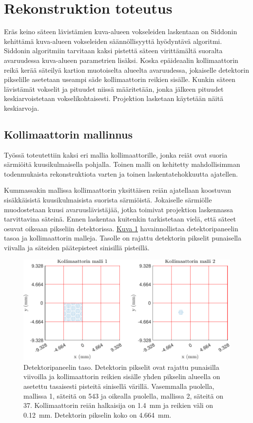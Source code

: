 \section{Rekonstruktion toteutus}
Eräs keino säteen lävistämien kuva-alueen vokseleiden laskentaan on Siddonin kehittämä kuva-alueen vokseleiden säännöllisyyttä hyödyntävä algoritmi\cite{siddon_fast_1985, sundermann_fast_1998}. Siddonin algoritmiin tarvitaan kaksi pistettä säteen virittämältä suoralta avaruudessa kuva-alueen parametrien lisäksi\cite{sundermann_fast_1998}. Koska epäideaalin kollimaattorin reikä kerää säteilyä kartion muotoiselta alueelta avaruudessa\cite{cherry_single_2012}, jokaiselle detektorin pikselille asetetaan useampi säde kollimaattorin reikien sisälle. Kunkin säteen lävistämät vokselit ja pituudet niissä määritetään, jonka jälkeen pituudet keskiarvoistetaan vokselikohtaisesti. Projektion lasketaan käytetään näitä keskiarvoja.

\subsection{Kollimaattorin mallinnus}
Työssä toteutettiin kaksi eri mallia kollimaattorille, jonka reiät ovat suoria särmiöitä kuusikulmaisella pohjalla. Toinen malli on kehitetty mahdollisimman todenmukaista rekonstruktiota varten ja toinen laskentatehokkuutta ajatellen.

Kummassakin mallissa kollimaattorin yksittäisen reiän ajatellaan koostuvan sisäkkäisistä kuusikulmaisista suorista särmiöistä. Jokaiselle särmiölle muodostetaan kuusi avaruuslävistäjää, jotka toimivat projektion laskennassa tarvittavina säteinä. Ennen laskentaa kuitenkin tarkistetaan vielä, että säteet osuvat oikeaan pikseliin detektorissa. \hyperref[fig:ray1]{Kuva \ref*{fig:ray1}} havainnollistaa detektoripaneelin tasoa ja kollimaattorin malleja. Tasolle on rajattu detektorin pikselit punaisella viivalla ja säteiden päätepisteet sinisillä pisteillä.

\begin{figure}[t]
    \centering
    \captionsetup{width=.9\textwidth}
    \includegraphics[width=.9\textwidth]{kuvat/2d-kollimaattori.pdf}
    \caption{Detektoripaneelin taso. Detektorin pikselit ovat rajattu punaisilla viivoilla ja kollimaattorin reikien sisälle yhden pikselin alueella on asetettu tasaisesti pisteitä sinisellä värillä. Vasemmalla puolella, mallissa 1, säteitä on 543 ja oikealla puolella, mallissa 2, säteitä on 37. Kollimaattorin reiän halkaisija on \qty{1.4}{\milli\meter} ja reikien väli on \qty{0.12}{\milli\meter}. Detektorin pikselin koko on \qty{4.664}{\milli\meter}.}
    \label{fig:ray1}
\end{figure}

